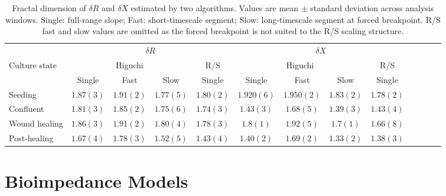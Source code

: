 \documentclass[english, 10pt, a4paper]{article}
\begin{document}
\begin{table}[H]
 \centering
 \caption{Fractal dimension of $\delta R$ and $\delta X$ estimated by two algorithms. Values are mean $\pm$ standard deviation across analysis windows. Single: full-range slope; Fast: short-timescale segment; Slow: long-timescale segment at forced breakpoint. R/S fast and slow values are omitted as the forced breakpoint is not suited to the R/S scaling structure.}
 \label{tab:fractal_dim}
 \scriptsize
 \begin{tabular}{lcccccccccccc}
  \toprule
  & \multicolumn{4}{c}{$\delta R$} & \multicolumn{4}{c}{$\delta X$} \\
  \cmidrule(lr){2-5} \cmidrule(lr){6-9}
  Culture state & \multicolumn{3}{c}{Higuchi} & R/S & \multicolumn{3}{c}{Higuchi} & R/S \\
  \cmidrule(lr){2-4} \cmidrule(lr){6-8}
   & Single & Fast & Slow & Single & Single & Fast & Slow & Single \\
  \midrule
  Seeding & $1.87 (3)$ & $1.91 (2)$ & $1.77 (5)$ & $1.80 (2)$ & $1.920 (6)$ & $1.950 (2)$ & $1.83 (2)$ & $1.78 (2)$ \\
  Confluent & $1.81 (3)$ & $1.85 (2)$ & $1.75 (6)$ & $1.74 (3)$ & $1.43 (3)$ & $1.68 (5)$ & $1.39 (3)$ & $1.43 (4)$ \\
  Wound healing & $1.86 (3)$ & $1.91 (2)$ & $1.80 (4)$ & $1.78 (3)$ & $1.8 (1)$ & $1.92 (5)$ & $1.7 (1)$ & $1.66 (8)$ \\
  Post-healing & $1.67 (4)$ & $1.78 (3)$ & $1.52 (5)$ & $1.43 (4)$ & $1.40 (2)$ & $1.69 (2)$ & $1.33 (2)$ & $1.38 (3)$ \\
  \bottomrule
  \end{tabular}
  \end{table}


\section{Bioimpedance Models}
\label{sec:model}
\end{document}
